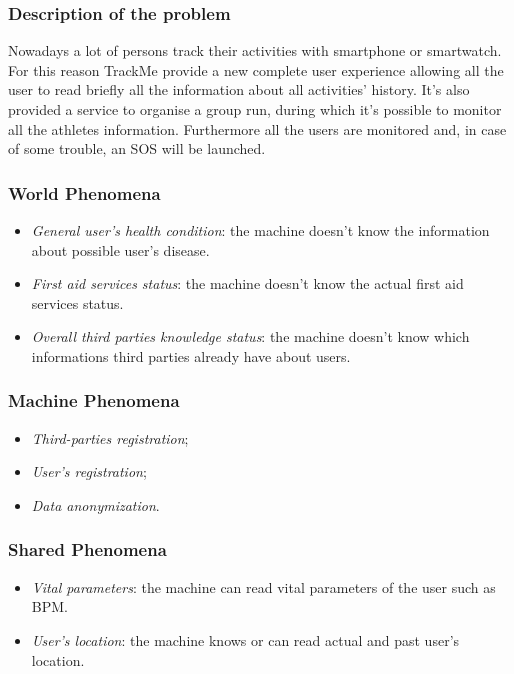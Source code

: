 \documentclass{article}
\begin{document}
\subsubsection{Description of the problem}
Nowadays a lot of persons track their activities with smartphone or smartwatch. For this reason TrackMe provide a new complete user experience allowing all the user to read briefly all the information about all activities’ history.
It’s also provided a service to organise a group run, during which it’s possible to monitor all the athletes information.
Furthermore all the users are monitored and, in case of some trouble, an SOS will be launched.

\subsubsection{World Phenomena}
\begin{itemize}
	\item \textit{General user’s health condition}: the machine doesn’t know the information about possible user’s disease.
	\item \textit{First aid services status}: the machine doesn’t know the actual first aid services status.
	\item \textit{Overall third parties knowledge status}: the machine doesn’t know which informations third parties already have about users.
\end{itemize}

\subsubsection{Machine Phenomena}
\begin{itemize}
	\item \textit{Third-parties registration};
	\item \textit{User's registration};
	\item \textit{Data anonymization}.
\end{itemize}

\subsubsection{Shared Phenomena}
\begin{itemize}
	\item \textit{Vital parameters}: the machine can read vital parameters of the user such as BPM.
	\item \textit{User's location}: the machine knows or can read actual and past user’s location.
\end{itemize}
\end{document}
